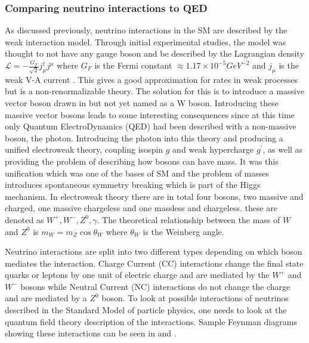\pagebreak

\subsubsection{Comparing neutrino interactions to QED}
As discussed previously, neutrino interactions in the SM are described by the weak interaction model. Through initial experimental studies, the model was thought to not have any gauge boson and be described by the Lagrangian density $\mathscr{L} = -\frac{G_F}{\sqrt{2}} j_\mu ^\dagger j^\mu$ where $G_F$ is the Fermi constant $\approx 1.17 \times 10^{-5} GeV^{-2}$ and $j_\mu$ is the weak V-A current \cite{47Soler}. This gives a good approximation for rates in weak processes but is a non-renormalizable theory. The solution for this is to introduce a massive vector boson drawn in  but not yet named as a W boson. Introducing these massive vector bosons leads to some interesting consequences since at this time only Quantum ElectroDynamics (QED) had been described with a non-massive boson, the photon. Introducing the photon into this theory and producing a unified electroweak theory, coupling isospin $g$ and weak hypercharge $g^\prime$, as well as providing the problem of describing how bosons can have mass. It was this unification which was one of the bases of SM and the problem of masses introduces spontaneous symmetry breaking which is part of the Higgs mechanism. In electroweak theory there are in total four bosons, two massive and charged, one massive chargeless and one massless and chargeless. these are denoted as $W^+, W^-, Z^0, \gamma$. The theoretical relationship between the mass of $W$ and $Z^0$ is $m_W = m_Z \cos \theta_W$ where $\theta_W$ is the Weinberg angle.

Neutrino interactions are split into two different types depending on which boson mediates the interaction.
Charge Current (CC) interactions change the final state quarks or leptons by one unit of electric charge and are mediated by the $W^+$ and $W^-$ bosons while Neutral Current (NC) interactions do not change the charge and are mediated by a $Z^0$ boson. 
To look at possible interactions of neutrinos described in the Standard Model of particle physics, one needs to look at the quantum field theory description of the interactions\cite{3Peskin, 2Hallsjo}. Sample Feynman diagrams showing these interactions can be seen in  and .

